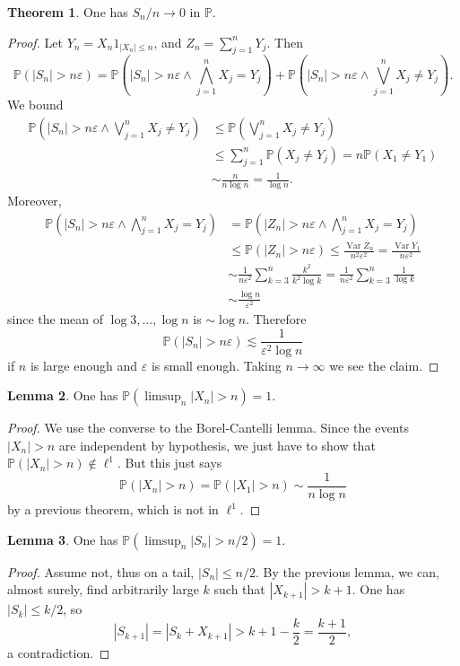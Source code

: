 \documentclass[10pt]{article}
\newcommand{\PP}{\mathbb P}
\newcommand{\Var}{\operatorname{Var}}
\theoremstyle{definition}
\newtheorem{lemma}{Lemma}[exer]
\newtheorem{theorem}[lemma]{Theorem}
\begin{document}
\begin{theorem}
One has $S_n/n \to 0$ in $\PP$.
\end{theorem}
\begin{proof}
Let $Y_n = X_n 1_{|X_n| \leq n}$, and $Z_n = \sum_{j=1}^n Y_j$. Then
$$\PP(|S_n| > n\varepsilon) = \PP\left(|S_n| > n\varepsilon \wedge \bigwedge_{j=1}^n X_j = Y_j\right) + \PP\left(|S_n| > n\varepsilon \wedge \bigvee_{j=1}^n X_j \neq Y_j\right).$$
We bound
\begin{align*}
\PP\left(|S_n| > n\varepsilon \wedge \bigvee_{j=1}^n X_j \neq Y_j\right) &\leq \PP\left(\bigvee_{j=1}^n X_j \neq Y_j\right)\\
&\leq \sum_{j=1}^n \PP(X_j \neq Y_j) = n\PP(X_1 \neq Y_1)\\
&\sim \frac{n}{n \log n} = \frac{1}{\log n}.
\end{align*}
Moreover,
\begin{align*}
\PP\left(|S_n| > n\varepsilon \wedge \bigwedge_{j=1}^n X_j = Y_j\right) &= \PP\left(|Z_n| > n\varepsilon \wedge \bigwedge_{j=1}^n X_j = Y_j\right) \\
&\leq \PP(|Z_n| > n\varepsilon) \leq \frac{\Var Z_n}{n^2 \varepsilon^2} = \frac{\Var Y_1}{n\varepsilon^2} \\
&\sim \frac{1}{n\varepsilon^2} \sum_{k=3}^n \frac{k^2}{k^2 \log k} = \frac{1}{n\varepsilon^2} \sum_{k=3}^n \frac{1}{ \log k} \\
&\sim \frac{\log n}{\varepsilon^2}
\end{align*}
since the mean of $\log 3, \dots, \log n$ is $\sim \log n$. Therefore
$$\PP(|S_n| > n\varepsilon) \lesssim \frac{1}{\varepsilon^2\log n}$$
if $n$ is large enough and $\varepsilon$ is small enough.
Taking $n \to \infty$ we see the claim.
\end{proof}

\begin{lemma}
One has $\PP(\limsup_n |X_n| > n) = 1$.
\end{lemma}
\begin{proof}
We use the converse to the Borel-Cantelli lemma.
Since the events $|X_n| > n$ are independent by hypothesis, we just have to show that $\PP(|X_n| > n) \notin \ell^1$. But this just says
$$\PP(|X_n| > n) = \PP(|X_1| > n) \sim \frac{1}{n \log n}$$
by a previous theorem, which is not in $\ell^1$.
\end{proof}

\begin{lemma}
One has $\PP(\limsup_n |S_n| > n/2) = 1$.
\end{lemma}
\begin{proof}
Assume not, thus on a tail, $|S_n| \leq n/2$.
By the previous lemma, we can, almost surely, find arbitrarily large $k$ such that $|X_{k+1}| > k + 1$. One has $|S_k| \leq k/2$, so
$$|S_{k+1}| = |S_k + X_{k+1}| > k + 1 - \frac{k}{2} = \frac{k+1}{2},$$
a contradiction.
\end{proof}
\end{document}
